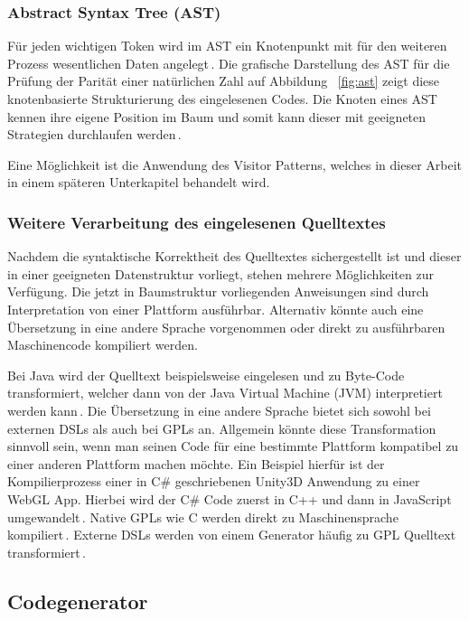 \documentclass[12pt,oneside,a4paper,parskip]{scrbook}
\begin{document}
\subsubsection{Abstract Syntax Tree (AST)}

Für jeden wichtigen Token wird im AST ein Knotenpunkt mit für den weiteren Prozess wesentlichen Daten angelegt\,\cite[S. 23]{parr2009}. Die grafische Darstellung des AST für die Prüfung der Parität einer natürlichen Zahl auf Abbildung ~\ref{fig:ast} zeigt diese knotenbasierte Strukturierung des eingelesenen Codes. Die Knoten eines AST kennen ihre eigene Position im Baum und somit kann dieser mit geeigneten Strategien durchlaufen werden\,\cite[S. 24]{parr2009}.

Eine Möglichkeit ist die Anwendung des Visitor Patterns, welches in dieser Arbeit in einem späteren Unterkapitel behandelt wird.

\subsubsection{Weitere Verarbeitung des eingelesenen Quelltextes}

Nachdem die syntaktische Korrektheit des Quelltextes sichergestellt ist und dieser in einer geeigneten Datenstruktur vorliegt, stehen mehrere Möglichkeiten zur Verfügung. Die jetzt in Baumstruktur vorliegenden Anweisungen sind durch Interpretation von einer Plattform ausführbar. Alternativ könnte auch eine Übersetzung in eine andere Sprache vorgenommen oder direkt zu ausführbaren Maschinencode kompiliert werden.

Bei Java wird der Quelltext beispielsweise eingelesen und zu Byte-Code transformiert, welcher dann von der Java Virtual Machine (JVM) interpretiert werden kann\,\cite{javavm2014}. Die Übersetzung in eine andere Sprache bietet sich sowohl bei externen DSLs als auch bei GPLs an. Allgemein könnte diese Transformation sinnvoll sein, wenn man seinen Code für eine bestimmte Plattform kompatibel zu einer anderen Plattform machen möchte. Ein Beispiel hierfür ist der Kompilierprozess einer in C\# geschriebenen Unity3D Anwendung zu einer WebGL App. Hierbei wird der C\# Code zuerst in C++ und dann in JavaScript umgewandelt\,\cite{unity2018}. Native GPLs wie C werden direkt zu Maschinensprache kompiliert\,\cite{kernighan1988}. Externe DSLs werden von einem Generator häufig zu GPL Quelltext transformiert\,\cite[S. 26]{voelter2013}.

\subsection{Codegenerator}
\end{document}
